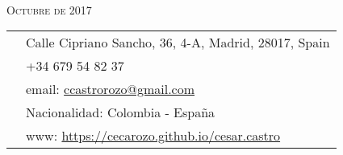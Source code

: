 \documentclass[11pt]{article}\usepackage[]{graphicx}\usepackage[]{color}
\begin{document}
\par{\\
\vspace{5pt}
{\color{headings} \scshape{Octubre de 2017}}\\
\vspace{10pt}}

\colorbox{shade}{{
\begin{tabular}{c|p{13cm}}
\vspace{5pt}\raisebox{-4pt}{\textifsymbol{18}} & Calle Cipriano Sancho, 36, 4-A, Madrid, 28017, Spain\\
\vspace{5pt}\raisebox{-4pt}{\Mobilefone} & +34 679 54 82 37\\
\vspace{5pt}\raisebox{-4pt}{\Letter} & email: \href{mailto:castrorozo@gmail.com}{ccastrorozo@gmail.com} \\
\vspace{5pt}\raisebox{-4pt}{\Aquarius} & Nacionalidad: Colombia - España\\
\vspace{5pt}\raisebox{-4pt}{\Mundus} & www: \href{https://cecarozo.github.io/cesar.castro}{https://cecarozo.github.io/cesar.castro}\\
\end{tabular}
}
}\\[10pt]



\end{document}
